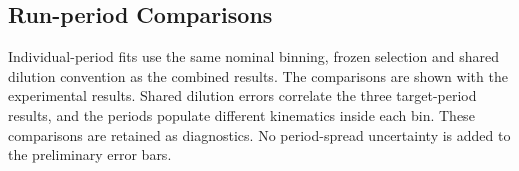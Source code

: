 \subsection{Run-period Comparisons}
Individual-period fits use the same nominal binning, frozen selection and shared dilution convention as the combined results. The comparisons are shown with the experimental results. Shared dilution errors correlate the three target-period results, and the periods populate different kinematics inside each bin. These comparisons are retained as diagnostics. No period-spread uncertainty is added to the preliminary error bars.
